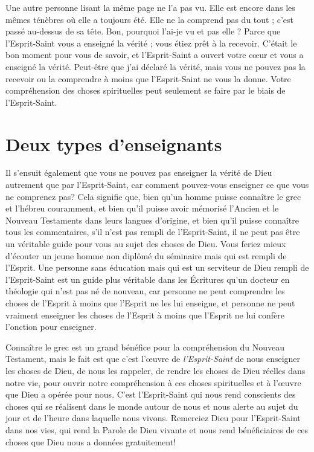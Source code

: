 Une autre personne lisant la même page ne l'a pas vu.
 Elle est encore dans les mêmes ténèbres où elle a toujours été.
 Elle ne la comprend pas du tout ; c'est passé au-dessus de sa tête.
 \Og Bon, pourquoi l'ai-je vu et pas elle ? \Fg{}
 Parce que l'Esprit-Saint vous a enseigné la vérité ;
 vous étiez prêt à la recevoir.
 C'était le bon moment pour vous de savoir, et l'Esprit-Saint
 a ouvert votre cœur et vous a enseigné la vérité.
 Peut-être que j'ai déclaré la vérité, mais vous ne pouvez pas la recevoir
 ou la comprendre à moins que l'Esprit-Saint ne vous la donne.
 Votre compréhension des choses spirituelles peut seulement se faire
 par le biais de l'Esprit-Saint.


\section{Deux types d'enseignants}

Il s'ensuit également que vous ne pouvez pas enseigner
 la vérité de Dieu autrement que par l'Esprit-Saint,
 car comment pouvez-vous enseigner ce que vous ne comprenez pas?
 Cela signifie que, bien qu'un homme puisse connaître le grec et l'hébreu
 couramment, et bien qu'il puisse avoir mémorisé l'Ancien
 et le Nouveau Testaments dans leurs langues d'origine,
 et bien qu'il puisse connaître tous les commentaires,
 s'il n'est pas rempli de l'Esprit-Saint,
 il ne peut pas être un véritable guide pour vous
 au sujet des choses de Dieu.
 Vous feriez mieux d'écouter un jeune homme non diplômé
 du séminaire mais qui est rempli de l'Esprit.
 Une personne sans éducation mais qui est un serviteur de Dieu
 rempli de l'Esprit-Saint est un guide plus véritable
 dans les Écritures qu'un docteur en théologie
 qui n'est pas né de nouveau,
 car personne ne peut comprendre les choses de l'Esprit
 à moins que l'Esprit ne les lui enseigne,
 et personne ne peut vraiment enseigner les choses de l'Esprit
 à moins que l'Esprit ne lui confère l'onction pour enseigner.

Connaître le grec est un grand bénéfice pour la compréhension
 du Nouveau Testament, mais le fait est que c'est l'œuvre
 de \emph{l'Esprit-Saint} de nous enseigner les choses de Dieu,
 de nous les rappeler, de rendre les choses de Dieu réelles
 dans notre vie, pour ouvrir notre compréhension
 à ces choses spirituelles et à l'œuvre que Dieu a opérée pour nous.
 C'est l'Esprit-Saint qui nous rend conscients des choses
 qui se réalisent dans le monde autour de nous et nous alerte
 au sujet du jour et de l'heure dans laquelle nous vivons.
 Remerciez Dieu pour l'Esprit-Saint dans nos vies,
 qui rend la Parole de Dieu vivante et nous rend bénéficiaires
 de ces choses que Dieu nous a données gratuitement!
\closechapter

